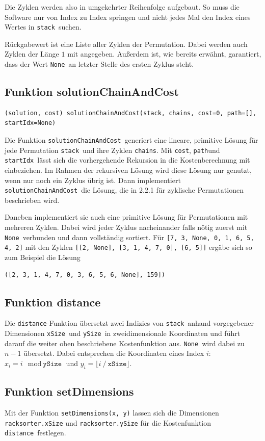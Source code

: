 \documentclass{fh-ium-bama}
\newcommand{\stack}{\lstinline|stack|}
\newcommand{\cost}{\lstinline|cost|}
\newcommand{\path}{\lstinline|path|}
\newcommand{\chains}{\lstinline|chains|}
\newcommand{\startIdx}{\lstinline|startIdx|}
\newcommand{\None}{\lstinline|None|}
\newcommand{\solcnc}{\lstinline|solutionChainAndCost|}
\newcommand{\dist}{\lstinline|distance|}
\newcommand{\xSize}{\lstinline|xSize|}
\newcommand{\ySize}{\lstinline|ySize|}
\begin{document}
Die Zyklen werden also in umgekehrter Reihenfolge aufgebaut. So muss die Software nur von Index zu Index springen und nicht jedes Mal den Index eines Wertes in \stack\ suchen.

Rückgabewert ist eine Liste aller Zyklen der Permutation. Dabei werden auch Zyklen der Länge $1$ mit angegeben. Außerdem ist, wie bereits erwähnt, garantiert, dass der Wert \None\ an letzter Stelle des ersten Zyklus steht.

\subsection{Funktion solutionChainAndCost}
\begin{lstlisting}
(solution, cost) solutionChainAndCost(stack, chains, cost=0, path=[], startIdx=None)
\end{lstlisting}
Die Funktion \solcnc\ generiert eine lineare, primitive Lösung für jede Permutation \stack\ und ihre Zyklen \chains. Mit \cost, \path und \startIdx\ lässt sich die vorhergehende Rekursion in die Kostenberechnung mit einbeziehen. Im Rahmen der rekursiven Lösung wird diese Lösung nur genutzt, wenn nur noch ein Zyklus übrig ist. Dann implementiert \solcnc\ die Lösung, die in 2.2.1 für zyklische Permutationen beschrieben wird.

Daneben implementiert sie auch eine primitive Lösung für Permutationen mit mehreren Zyklen. Dabei wird jeder Zyklus nacheinander falls nötig zuerst mit \None\ verbunden und dann vollständig sortiert. Für \lstinline|[7, 3, None, 0, 1, 6, 5, 4, 2]| mit den Zyklen \lstinline|[[2, None], [3, 1, 4, 7, 0], [6, 5]]| ergäbe sich so zum Beispiel die Lösung
\begin{lstlisting}
([2, 3, 1, 4, 7, 0, 3, 6, 5, 6, None], 159])
\end{lstlisting}

\subsection{Funktion distance}
Die \dist-Funktion übersetzt zwei Indizies von \stack\ anhand vorgegebener Dimensionen \xSize\ und \ySize\ in zweidimensionale Koordinaten und führt darauf die weiter oben beschriebene Kostenfunktion aus. \None\ wird dabei zu $n - 1$ übersetzt. Dabei entsprechen die Koordinaten eines Index $i$: $x_i = i \mod \texttt{ySize}$ und $y_i = \lfloor i ~/~ \texttt{xSize}\rfloor $.

\subsection{Funktion setDimensions}
Mit der Funktion \lstinline|setDimensions(x, y)| lassen sich die Dimensionen \lstinline|racksorter.xSize| und \lstinline|racksorter.ySize| für die Kostenfunktion \dist\ festlegen.
\end{document}
